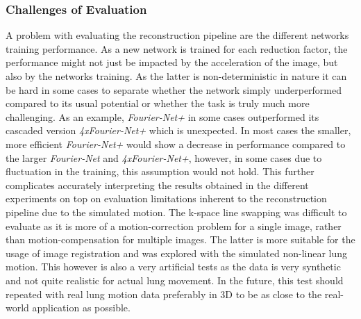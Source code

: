 \subsubsection{Challenges of Evaluation} \label{SubSubSec:ChallengesEvaluation}
A problem with evaluating the reconstruction pipeline are the different networks training performance. As a new network is trained for each reduction factor, the performance might not just be impacted by the acceleration of the image, but also by the networks training. As the latter is non-deterministic in nature it can be hard in some cases to separate whether the network simply underperformed compared to its usual potential or whether the task is truly much more challenging. As an example, \emph{Fourier-Net+} in some cases outperformed its cascaded version \emph{4xFourier-Net+} which is unexpected. In most cases the smaller, more efficient \emph{Fourier-Net+} would show a decrease in performance compared to the larger \emph{Fourier-Net} and \emph{4xFourier-Net+}, however, in some cases due to fluctuation in the training, this assumption would not hold. This further complicates accurately interpreting the results obtained in the different experiments on top on evaluation limitations inherent to the reconstruction pipeline due to the simulated motion. The k-space line swapping was difficult to evaluate as it is more of a motion-correction problem for a single image, rather than motion-compensation for multiple images. The latter is more suitable for the usage of image registration and was explored with the simulated non-linear lung motion. This however is also a very artificial tests as the data is very synthetic and not quite realistic for actual lung movement. In the future, this test should repeated with real lung motion data preferably in 3D to be as close to the real-world application as possible.
